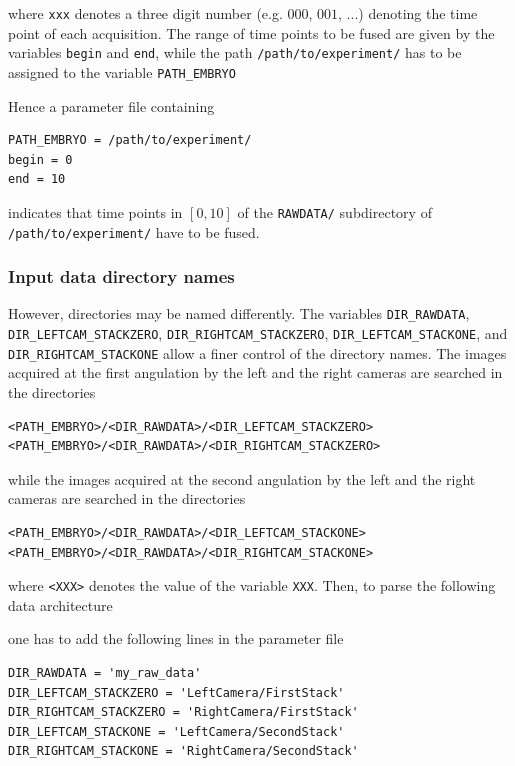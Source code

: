 where \texttt{xxx} denotes a three digit number (e.g. $000$, $001$,
...) denoting the time point of each acquisition. The range of time
points to be fused are given by the variables \texttt{begin} and
\texttt{end}, while the path \texttt{/path/to/experiment/} has to be
assigned to the variable \texttt{PATH\_EMBRYO} 

Hence a parameter file containing
\begin{verbatim}
PATH_EMBRYO = /path/to/experiment/
begin = 0
end = 10
\end{verbatim}
indicates that time points in $[0,10]$ of the \texttt{RAWDATA/}
subdirectory of  \texttt{/path/to/experiment/} have to be fused.

\subsubsection{Input data directory names}

However, directories may be named differently. The variables
\texttt{DIR\_RAWDATA}, \texttt{DIR\_LEFTCAM\_STACKZERO},
\texttt{DIR\_RIGHTCAM\_STACKZERO}, \texttt{DIR\_LEFTCAM\_STACKONE},
and \texttt{DIR\_RIGHTCAM\_STACKONE} allow a finer control of the
directory names. The images acquired at the first angulation by the
left and the right cameras are searched in the directories
\begin{verbatim}
<PATH_EMBRYO>/<DIR_RAWDATA>/<DIR_LEFTCAM_STACKZERO>
<PATH_EMBRYO>/<DIR_RAWDATA>/<DIR_RIGHTCAM_STACKZERO>
\end{verbatim}
while the images acquired at the second angulation by the
left and the right cameras are searched in the directories
\begin{verbatim}
<PATH_EMBRYO>/<DIR_RAWDATA>/<DIR_LEFTCAM_STACKONE>
<PATH_EMBRYO>/<DIR_RAWDATA>/<DIR_RIGHTCAM_STACKONE>
\end{verbatim}
where \texttt{<XXX>} denotes the value of the variable \texttt{XXX}.
Then, to parse the following data architecture

\mbox{}
\mbox{}

one has to add the following lines in the parameter file
\begin{verbatim}
DIR_RAWDATA = 'my_raw_data'
DIR_LEFTCAM_STACKZERO = 'LeftCamera/FirstStack'
DIR_RIGHTCAM_STACKZERO = 'RightCamera/FirstStack'
DIR_LEFTCAM_STACKONE = 'LeftCamera/SecondStack'
DIR_RIGHTCAM_STACKONE = 'RightCamera/SecondStack'
\end{verbatim}

